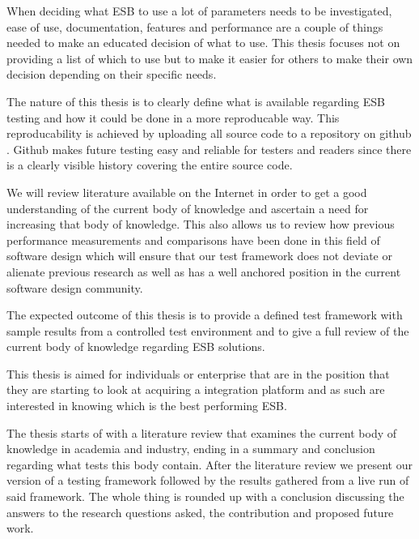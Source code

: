 When deciding what ESB to use a lot of parameters needs to be investigated, ease of use, documentation, features and performance are a couple of things needed to make an educated decision of what to use. 
This thesis focuses not on providing a list of which to use but to make it easier for others to make their own decision depending on their specific needs.

The nature of this thesis is to clearly define what is available regarding ESB testing and how it could be done in a more reproducable way. 
This reproducability is achieved by uploading all source code to a repository on github \cite{github}.
Github makes future testing easy and reliable for testers and readers since there is a clearly visible history covering the entire source code.


We will review literature available on the Internet in order to get a good understanding of the current body of knowledge and ascertain a need for increasing that body of knowledge. 
This also allows us to review how previous performance measurements and comparisons have been done in this field of software design which will ensure that our test framework does not deviate or alienate previous research as well as has a well anchored position in the current software design community.

The expected outcome of this thesis is to provide a defined test framework with sample results from a controlled test environment and to give a full review of the current body of knowledge regarding ESB solutions.

This thesis is aimed for individuals or enterprise that are in the position that they are starting to look at acquiring a integration platform and as such are interested in knowing which is the best performing ESB.

The thesis starts of with a literature review that examines the current body of knowledge in academia and industry, ending in a summary and conclusion regarding what tests this body contain.
After the literature review we present our version of a testing framework followed by the results gathered from a live run of said framework.
The whole thing is rounded up with a conclusion discussing the answers to the research questions asked, the contribution and proposed future work.
